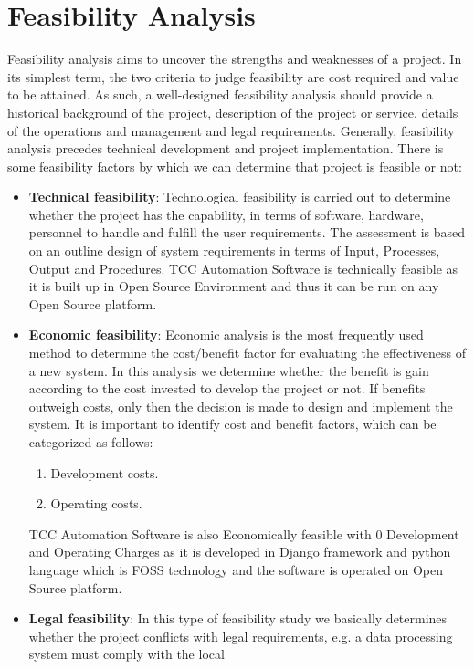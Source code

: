 \section{Feasibility Analysis}
Feasibility analysis aims to uncover the strengths and weaknesses of 
a project. In its simplest term, the two criteria to judge feasibility 
are cost required and value to be attained. As such, a well-designed 
feasibility analysis should provide a historical background of the 
project, description of the project or service, details of the 
operations and management and legal requirements. Generally, feasibility 
analysis precedes technical development and project implementation. 
There is some feasibility factors by which we can determine that 
project is feasible or not:
\begin{itemize}
\item {\bf{Technical feasibility}}: Technological feasibility is carried 
out to determine whether the project has the capability, in terms of 
software, hardware, personnel to handle and fulfill the user 
requirements. The assessment is based on an outline design of system 
requirements in terms of Input, Processes, Output and Procedures. TCC 
Automation Software is technically feasible as it is built up in Open 
Source Environment and thus it can be run on any Open Source platform.
\item {\bf{Economic feasibility}}: Economic analysis is the most 
frequently used method to determine the cost/benefit factor for 
evaluating the effectiveness of a new system. In this analysis we 
determine whether the benefit is gain according to the cost invested 
to develop the project or not. If benefits outweigh costs, only then 
the decision is made to design and implement the system. It is 
important to identify cost and benefit factors, which can be categorized 
as follows:
\begin{enumerate}
\item Development costs.
\item Operating costs.
\end{enumerate}
TCC Automation Software is also Economically feasible with 0 Development 
and Operating Charges as it is developed in Django framework and python 
language which is FOSS technology and the software is operated on Open 
Source platform.
\item {\bf {Legal feasibility}}: In this type of feasibility study we 
basically determines whether the project conflicts with legal 
requirements, e.g. a data processing system must comply with the local 

\end{itemize}
